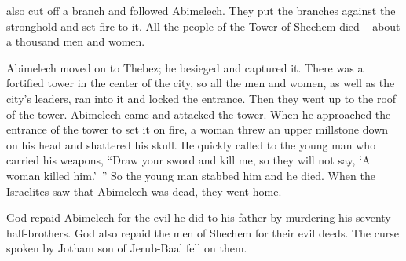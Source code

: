 {also
cut off
a branch
and followed
Abimelech.
They put
the branches against
the stronghold
and set
fire
to it.
All
the people
of the Tower
of Shechem
died
– about a thousand
men
and women.
\par }{\PP {}Abimelech
moved
on to
Thebez;
he besieged
and captured it.
There was
a fortified
tower
in the center
of the city,
so all
the men
and women,
as well as the city’s
leaders,
ran
into it and locked
the entrance. Then they went up
to
the roof
of the tower.
Abimelech
came
and attacked
the tower.
When he approached
the entrance
of the tower
to set it on fire,
a woman
threw
an
upper millstone
down on
his
head
and shattered
his skull.
He quickly
called
to
the young man
who carried
his weapons, “Draw
your sword
and kill
me, so
they will not say, ‘A woman
killed
him.’ ” So the young man
stabbed
him and he died.
When the Israelites
saw
that
Abimelech
was dead,
they went
home.
\par }{\PP {}God
repaid
Abimelech
for the evil
he did
to his father
by murdering
his seventy
half-brothers.
God
also repaid
the men
of Shechem
for their evil
deeds. The curse
spoken
by
Jotham
son
of Jerub-Baal fell on them.

\par }
